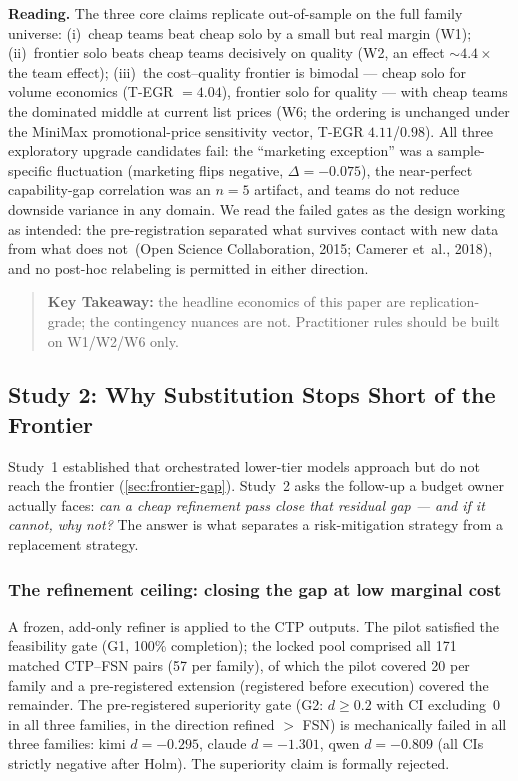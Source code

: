 \documentclass[12pt,a4paper]{article}
\begin{document}
\textbf{Reading.} The three core claims replicate out-of-sample on the full
family universe: (i)~cheap teams beat cheap solo by a small but real margin
(W1); (ii)~frontier solo beats cheap teams decisively on quality (W2, an
effect $\sim 4.4\times$ the team effect); (iii)~the cost--quality frontier is
bimodal --- cheap solo for volume economics (T-EGR $= 4.04$), frontier solo
for quality --- with cheap teams the dominated middle at current list prices
(W6; the ordering is unchanged under the MiniMax promotional-price sensitivity
vector, T-EGR $4.11$/$0.98$). All three exploratory upgrade candidates fail:
the ``marketing exception'' was a sample-specific fluctuation (marketing flips
negative, $\Delta = -0.075$), the near-perfect capability-gap correlation was
an $n = 5$ artifact, and teams do not reduce downside variance in any domain.
We read the failed gates as the design working as intended: the
pre-registration separated what survives contact with new data from what does
not~(Open Science Collaboration, 2015; Camerer et~al., 2018), and no post-hoc
relabeling is permitted in either direction.

\begin{quote}
\textbf{Key Takeaway:} the headline economics of this paper are
replication-grade; the contingency nuances are not. Practitioner rules should
be built on W1/W2/W6 only.
\end{quote}

\subsection{Study 2: Why Substitution Stops Short of the Frontier}\label{sec:study2}

Study~1 established that orchestrated lower-tier models approach but do not
reach the frontier (\cref{sec:frontier-gap}). Study~2 asks the follow-up a
budget owner actually faces: \emph{can a cheap refinement pass close that
residual gap --- and if it cannot, why not?} The answer is what separates a
risk-mitigation strategy from a replacement strategy.

\subsubsection{The refinement ceiling: closing the gap at low marginal cost}\label{sec:refinement}

A frozen, add-only refiner is applied to the CTP outputs. The pilot satisfied
the feasibility gate (G1, 100\% completion); the locked pool comprised all 171
matched CTP--FSN pairs (57 per family), of which the pilot covered 20 per
family and a pre-registered extension (registered before execution) covered
the remainder. The pre-registered superiority gate (G2: $d \ge 0.2$ with CI
excluding~0 in all three families, in the direction refined $>$ FSN) is
mechanically failed in all three families: kimi $d = -0.295$, claude $d =
-1.301$, qwen $d = -0.809$ (all CIs strictly negative after Holm). The
superiority claim is formally rejected.
\end{document}
